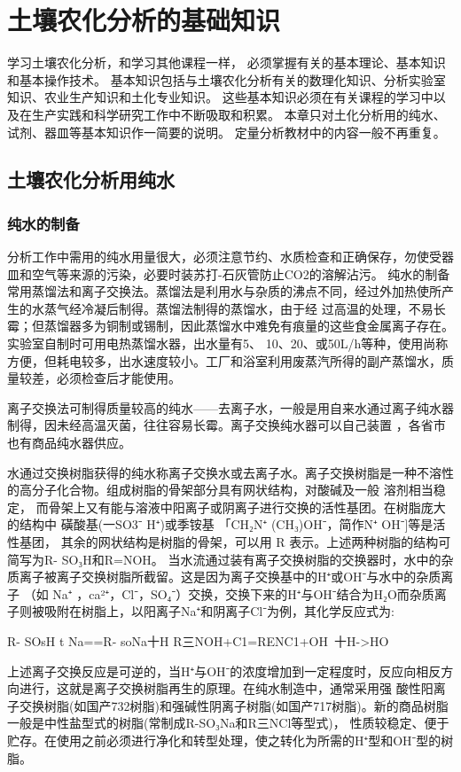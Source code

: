 \chapter{土壤农化分析的基础知识}
学习土壤农化分析，和学习其他课程一样， 必须掌握有关的基本理论、基本知识和基本操作技术。
基本知识包括与土壤农化分析有关的数理化知识、分析实验室知识、农业生产知识和土化专业知识。
这些基本知识必须在有关课程的学习中以及在生产实践和科学研究工作中不断吸取和积累。
本章只对土化分析用的纯水、试剂、器皿等基本知识作一简要的说明。
定量分析教材中的内容一般不再重复。

\section{土壤农化分析用纯水}
\subsection{纯水的制备}

分析工作中需用的纯水用量很大，必须注意节约、水质检查和正确保存，勿使受器皿和空气等来源的污染，必要时装苏打-石灰管防止CO2的溶解沾污。
纯水的制备常用蒸馏法和离子交换法。蒸馏法是利用水与杂质的沸点不同，经过外加热使所产生的水蒸气经冷凝后制得。蒸馏法制得的蒸馏水，由于经
过高温的处理，不易长霉；但蒸馏器多为铜制或锡制，因此蒸馏水中难免有痕量的这些食金属离子存在。实验室自制时可用电热蒸馏水器，出水量有5、
10、20、或50L/h等种，使用尚称方便，但耗电较多，出水速度较小。工厂和浴室利用废蒸汽所得的副产蒸馏水，质量较差，必须检查后才能使用。

离子交换法可制得质量较高的纯水——去离子水，一般是用自来水通过离子纯水器制得，因未经高温灭菌，往往容易长霉。离子交换纯水器可以自己装置
，各省市也有商品纯水器供应。

水通过交换树脂获得的纯水称离子交换水或去离子水。离子交换树脂是一种不溶性的高分子化合物。组成树脂的骨架部分具有网状结构，对酸碱及一般
溶剂相当稳定， 而骨架上又有能与溶液中阳离子或阴离子进行交换的活性基团。在树脂庞大的结构中 磺酸基(一SO3⁻ H⁺)或季铵基
「CH₂N⁺  (CH₃)OH⁻，简作N⁺ OH⁻]等是活性基团， 其余的网状结构是树脂的骨架，可以用 R 表示。上述两种树脂的结构可简写为R- SO₃H和R=NOH。
当水流通过装有离子交换树脂的交换器时，水中的杂质离子被离子交换树脂所截留。这是因为离子交换基中的H⁺或OH⁻与水中的杂质离子
（如 Na⁺ ，ca²⁺，Cl⁻，SO₄⁻）交换，交换下来的H⁺与OH⁻结合为H₂O而杂质离子则被吸附在树脂上，以阳离子Na⁺和阴离子Cl⁻为例，其化学反应式为:

R- SOsH t Na==R- soNa十H
R三NOH+C1=RENC1+OH~十H->HO

上述离子交换反应是可逆的，当H⁺与OH⁻的浓度增加到一定程度时，反应向相反方向进行，这就是离子交换树脂再生的原理。在纯水制造中，通常采用强
酸性阳离子交换树脂(如国产732树脂)和强碱性阴离子树脂(如国产717树脂)。新的商品树脂一般是中性盐型式的树脂(常制成R-SO₃Na和R三NCl等型式)，
性质较稳定、便于贮存。在使用之前必须进行净化和转型处理，使之转化为所需的H⁺型和OH⁻型的树脂。

